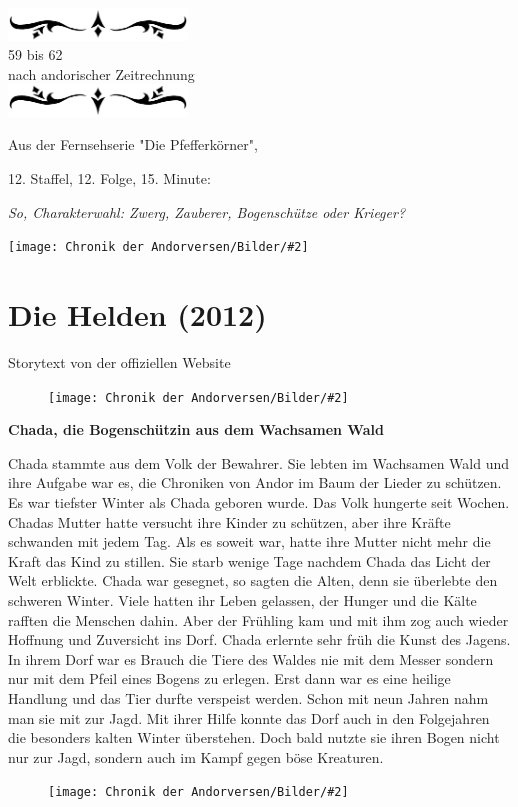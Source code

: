 \documentclass[10pt, a4paper, oneside]{book}
\newcommand{\fillbreak}{\vspace*{\fill}\columnbreak}
\newcommand{\storytext}[1]{%
    \section{#1}%
    \label{Storytext: #1}%
}
\newcommand{\bildmitts}[2][height=0.32\textwidth,width=0.48\textwidth,keepaspectratio]{%
    \begin{center}
        \texttt{[image: Chronik der Andorversen/Bilder/\#2]}
    \end{center}
}
\newcommand{\bildlinks}[2][height=0.32\textwidth,width=0.48\textwidth,keepaspectratio]{%
    \begin{figure}
        \texttt{[image: Chronik der Andorversen/Bilder/\#2]}
    \end{figure}
}
\newcommand{\az}[1]{%
    \begin{center}
        \includegraphics[width=180px]{Chronik der Andorversen/verzierung1.png}\\
        {\Huge #1} \\
        {nach andorischer Zeitrechnung}\\
        \includegraphics[width=180px]{Chronik der Andorversen/verzierung2.png}
    \end{center}
    \extramarks{}{#1 a.Z.}
}
\begin{document}
\begin{multicols}{2}
\begin{chapterbox}
    \az{59 bis 62}
    
    \begin{center}
        Aus der Fernsehserie "Die Pfefferkörner",
        
        12. Staffel, 12. Folge, 15. Minute:
    \end{center}
    
    \textit{So, Charakterwahl: Zwerg, Zauberer, Bogenschütze oder Krieger?}
    
    
    \bildmitts[width=\textwidth]{Zuckerberg Banner Helden.jpg}    
\end{chapterbox}



\fillbreak
\storytext{Die Helden (2012)}

\begin{center}
    Storytext von der offiziellen Website
\end{center}

\bildlinks[width=0.1\textwidth]{Die Helden Chada.jpg}

\textbf{Chada, die Bogenschützin aus dem Wachsamen Wald}

Chada stammte aus dem Volk der Bewahrer. Sie lebten im Wachsamen Wald und ihre Aufgabe war es, die Chroniken von Andor im Baum der Lieder zu schützen. Es war tiefster Winter als Chada geboren wurde. Das Volk hungerte seit Wochen. Chadas Mutter hatte versucht ihre Kinder zu schützen, aber ihre Kräfte schwanden mit jedem Tag. Als es soweit war, hatte ihre Mutter nicht mehr die Kraft das Kind zu stillen. Sie starb wenige Tage nachdem Chada das Licht der Welt erblickte. Chada war gesegnet, so sagten die Alten, denn sie überlebte den schweren Winter. Viele hatten ihr Leben gelassen, der Hunger und die Kälte rafften die Menschen dahin. Aber der Frühling kam und mit ihm zog auch wieder Hoffnung und Zuversicht ins Dorf. Chada erlernte sehr früh die Kunst des Jagens. In ihrem Dorf war es Brauch die Tiere des Waldes nie mit dem Messer sondern nur mit dem Pfeil eines Bogens zu erlegen. Erst dann war es eine heilige Handlung und das Tier durfte verspeist werden. Schon mit neun Jahren nahm man sie mit zur Jagd. Mit ihrer Hilfe konnte das Dorf auch in den Folgejahren die besonders kalten Winter überstehen. Doch bald nutzte sie ihren Bogen nicht nur zur Jagd, sondern auch im Kampf gegen böse Kreaturen.\bigskip



\bildlinks[width=0.1\textwidth]{Die Helden Eara.jpg}


\end{multicols}
\end{document}
